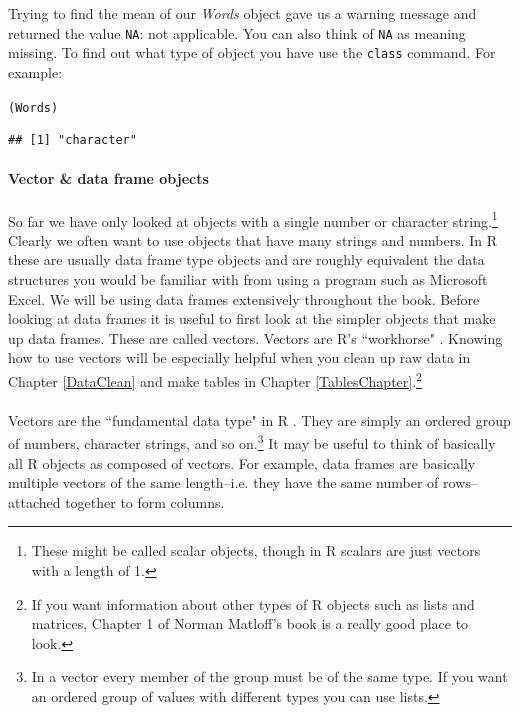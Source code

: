 \noindent Trying to find the mean of our {\emph{Words}} object gave us a warning message and returned the value {\tt{NA}}: not applicable. You can also think of {\tt{NA}} as meaning missing. To find out what type of object you have use the {\tt{class}} command. For example:

\begin{knitrout}
\color{fgcolor}\begin{kframe}
\begin{alltt}
(Words)
\end{alltt}
\begin{verbatim}
## [1] "character"
\end{verbatim}
\end{kframe}
\end{knitrout}


\paragraph{Vector \& data frame objects}

So far we have only looked at objects with a single number or character string.\footnote{These might be called scalar objects, though in R scalars are just vectors with a length of 1.} Clearly we often want to use objects that have many strings and numbers. In R these are usually data frame type objects and are roughly equivalent the data structures you would be familiar with from using a program such as Microsoft Excel. We will be using data frames extensively throughout the book. Before looking at data frames it is useful to first look at the simpler objects that make up data frames. These are called vectors. Vectors are R's ``workhorse" \cite[]{Matloff2011}. Knowing how to use vectors will be especially helpful when you clean up raw data in Chapter \ref{DataClean} and make tables in Chapter \ref{TablesChapter}.\footnote{If you want information about other types of R objects such as lists and matrices, Chapter 1 of Norman Matloff's \citeyearpar{Matloff2011} book is a really good place to look.} \\[0.25cm]

 \\[0.25cm] Vectors are the ``fundamental data type" in R \cite[]{Matloff2011}. They are simply an ordered group of numbers, character strings, and so on.\footnote{In a vector every member of the group must be of the same type. If you want an ordered group of values with different types you can use lists.} It may be useful to think of basically all R objects as composed of vectors. For example, data frames are basically multiple vectors of the same length--i.e. they have the same number of rows--attached together to form columns. 

